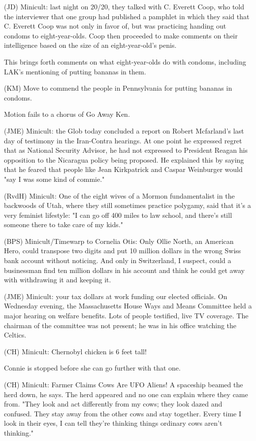 \documentclass[12pt]{article}
\begin{document}
(JD) Minicult: last night on 20/20, they talked with C. Everett Coop, who told the interviewer that one group had published a pamphlet in which they said that C. Everett Coop was not only in favor of, but was practicing handing out condoms to eight-year-olds. Coop then proceeded to make comments on their intelligence based on the size of an eight-year-old's penis.

This brings forth comments on what eight-year-olds do with condoms, including LAK's mentioning of putting bananas in them.

(KM) Move to commend the people in Pennsylvania for putting bananas in condoms.

Motion fails to a chorus of Go Away Ken.

(JME) Minicult: the Glob today concluded a report on Robert Mcfarland's last day of testimony in the Iran-Contra hearings. At one point he expressed regret that as National Security Advisor, he had not expressed to President Reagan his opposition to the Nicaragua policy being proposed. He explained this by saying that he feared that people like Jean Kirkpatrick and Caspar Weinburger would "say I was some kind of commie."

(RvdH) Minicult: One of the eight wives of a Mormon fundamentalist in the backwoods of Utah, where they still sometimes practice polygamy, said that it's a very feminist lifestyle: "I can go off 400 miles to law school, and there's still someone there to take care of my kids."

(BPS) Minicult/Timewarp to Cornelia Otis: Only Ollie North, an American Hero, could transpose two digits and put 10 million dollars in the wrong Swiss bank account without noticing. And only in Switzerland, I suspect, could a businessman find ten million dollars in his account and think he could get away with withdrawing it and keeping it.

(JME) Minicult: your tax dollars at work funding our elected officials. On Wednesday evening, the Massachusetts House Ways and Means Committee held a major hearing on welfare benefits. Lots of people testified, live TV coverage. The chairman of the committee was not present; he was in his office watching the Celtics.

(CH) Minicult: Chernobyl chicken is 6 feet tall!

Connie is stopped before she can go further with that one.

(CH) Minicult: Farmer Claims Cows Are UFO Aliens! A spaceship beamed the herd down, he says. The herd appeared and no one can explain where they came from. "They look and act differently from my cows; they look dazed and confused. They stay away from the other cows and stay together. Every time I look in their eyes, I can tell they're thinking things ordinary cows aren't thinking."
\end{document}
